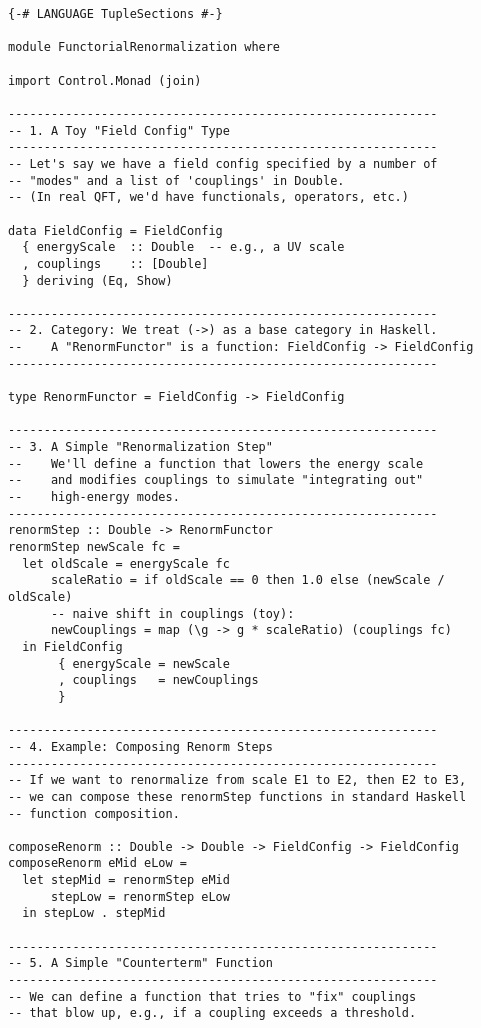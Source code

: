 \documentclass[12pt]{article}
\begin{document}
\begin{verbatim}
{-# LANGUAGE TupleSections #-}

module FunctorialRenormalization where

import Control.Monad (join)

------------------------------------------------------------
-- 1. A Toy "Field Config" Type
------------------------------------------------------------
-- Let's say we have a field config specified by a number of 
-- "modes" and a list of 'couplings' in Double. 
-- (In real QFT, we'd have functionals, operators, etc.)

data FieldConfig = FieldConfig
  { energyScale  :: Double  -- e.g., a UV scale
  , couplings    :: [Double]
  } deriving (Eq, Show)

------------------------------------------------------------
-- 2. Category: We treat (->) as a base category in Haskell.
--    A "RenormFunctor" is a function: FieldConfig -> FieldConfig
------------------------------------------------------------

type RenormFunctor = FieldConfig -> FieldConfig

------------------------------------------------------------
-- 3. A Simple "Renormalization Step"
--    We'll define a function that lowers the energy scale
--    and modifies couplings to simulate "integrating out"
--    high-energy modes.
------------------------------------------------------------
renormStep :: Double -> RenormFunctor
renormStep newScale fc =
  let oldScale = energyScale fc
      scaleRatio = if oldScale == 0 then 1.0 else (newScale / oldScale)
      -- naive shift in couplings (toy):
      newCouplings = map (\g -> g * scaleRatio) (couplings fc)
  in FieldConfig
       { energyScale = newScale
       , couplings   = newCouplings
       }

------------------------------------------------------------
-- 4. Example: Composing Renorm Steps
------------------------------------------------------------
-- If we want to renormalize from scale E1 to E2, then E2 to E3,
-- we can compose these renormStep functions in standard Haskell 
-- function composition.

composeRenorm :: Double -> Double -> FieldConfig -> FieldConfig
composeRenorm eMid eLow =
  let stepMid = renormStep eMid
      stepLow = renormStep eLow
  in stepLow . stepMid

------------------------------------------------------------
-- 5. A Simple "Counterterm" Function
------------------------------------------------------------
-- We can define a function that tries to "fix" couplings 
-- that blow up, e.g., if a coupling exceeds a threshold.


\end{verbatim}
\end{document}
